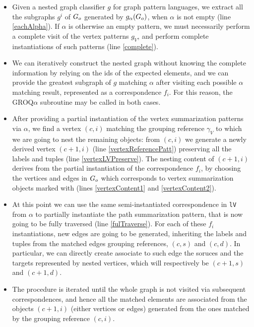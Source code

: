 \begin{itemize}
	\item Given a nested graph classifier $g$ for graph pattern languages, we extract all the subgraphs $g^i$ of $G_o$ generated by  $g_\alpha(G_o)$, when $\alpha$ is not empty (line \ref{eachAlpha}). If $\alpha$ is otherwise an empty pattern, we must necessarily perform a complete visit of the vertex patterns $g_V$, and perform complete instantiations of such patterns (line \ref{complete}). 
	\item We can iteratively construct the nested graph without knowing the complete information by relying on the ids of the expected elements, and we can provide the greatest subgraph of $g$ matching $\alpha$  after visiting  each possible $\alpha$ matching result, represented as a correspondence $f_i$. For this reason, the GROQ$\alpha$ subroutine may be called in both cases.
	
	\item After providing a partial instantiation of the vertex summarization patterns via $\alpha$, we find a vertex $(c,i)$ matching the grouping reference $\gamma_V$ to which we are going to nest the remaining objects: from $(c,i)$ we generate a newly derived vertex $({c+1},i)$ %
	(line \ref{vertexReferencePatt}) preserving all the labels and tuples (line \ref{vertexLVPreserve}). The nesting content of $({c+1},i)$ derives from the partial instantiation of the correspondence $f_i$, by choosing the vertices and edges in $G_o$ which corresponds to vertex summarization objects marked with  (lines \ref{vertexContent1} and \ref{vertexContent2}).
	
	\item At this point we can use the same semi-instantiated correspondence in \texttt{lV} from $\alpha$ to partially instantiate the path summarization pattern, that  is now going to be fully traversed (line \ref{fulTraverse}). For each of these $f_i$ instantiations, new edges are going to be generated, inheriting the labels and tuples from the matched edges grouping references, $(c,s)$ and $(c,d)$. In particular, we can directly create associate to such edge the soruces and the targets represented by nested vertices, which will respectively be $(c+1,s)$ and $({c+1},d)$.
	
	\item The procedure is iterated until the whole graph is not visited via subsequent correspondences, and hence all the matched elements are associated from the objects $({c+1},i)$ (either vertices or edges) generated from the ones matched by the grouping reference $(c,i)$.
\end{itemize}

